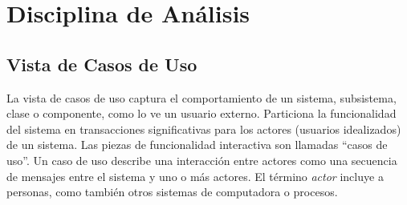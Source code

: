 
\chapter{Disciplina de Análisis}
\label{chap:analisis}

\section{Vista de Casos de Uso}

La vista de casos de uso captura el comportamiento de un sistema, subsistema, clase o componente, como lo ve un usuario externo. Particiona la funcionalidad del sistema en transacciones significativas para los actores (usuarios idealizados) de un sistema. Las piezas de funcionalidad interactiva son llamadas ``casos de uso''. Un caso de uso describe una interacción entre actores como una secuencia de mensajes entre el sistema y uno o más actores. El término \emph{actor} incluye a personas, como también otros sistemas de computadora o procesos.

